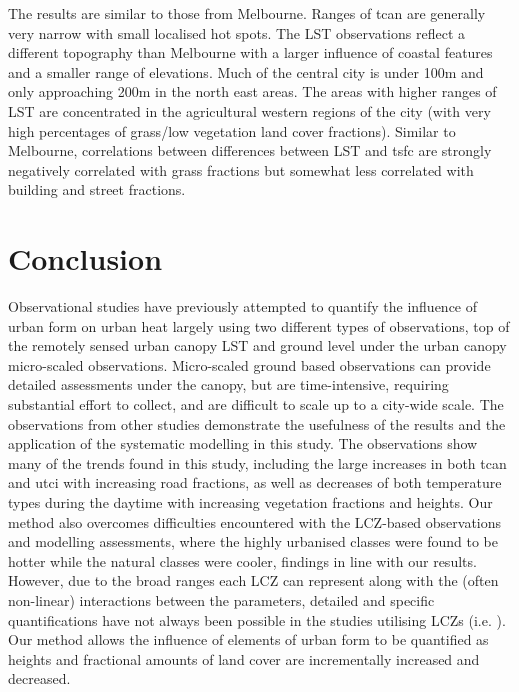 \documentclass[final,3p,times,authoryear]{elsarticle}
\begin{document}
The results are similar to those from Melbourne. Ranges of \gls{tcan} are generally very narrow with small localised hot spots. The LST observations reflect a different topography than Melbourne with a larger influence of coastal features and a smaller range of elevations. Much of the central city is under 100m and only approaching 200m in the north east areas. The areas with higher ranges of LST are concentrated in the agricultural western regions of the city (with very high percentages of grass/low vegetation land cover fractions). Similar to Melbourne, correlations between differences between LST and \gls{tsfc} are strongly negatively correlated with grass fractions but somewhat less correlated with building and street fractions.


\section{Conclusion}\label{sec:conclusion}

Observational studies have previously attempted to quantify the influence of urban form on urban heat largely using two different types of observations, top of the remotely sensed urban canopy LST and ground level under the urban canopy micro-scaled observations. Micro-scaled ground based observations can provide detailed assessments under the canopy, but are time-intensive, requiring substantial effort to collect, and are difficult to scale up to a city-wide scale. The observations from other studies demonstrate the usefulness of the results and the application of the systematic modelling in this study. The observations show many of the trends found in this study, including the large increases in both \gls{tcan} and \gls{utci} with increasing road fractions, as well as decreases of both temperature types during the daytime with increasing vegetation fractions and heights. Our method also overcomes difficulties encountered with the LCZ-based observations and modelling assessments, where the highly urbanised classes were found to be hotter while the natural classes were cooler, findings in line with our results. However, due to the broad ranges each LCZ can represent along with the (often non-linear) interactions between the parameters, detailed and specific quantifications have not always been possible in the studies utilising LCZs (i.e. \cite{Emery2021}). Our method allows the influence of elements of urban form to be quantified as heights and fractional amounts of land cover are incrementally increased and decreased.
\end{document}
